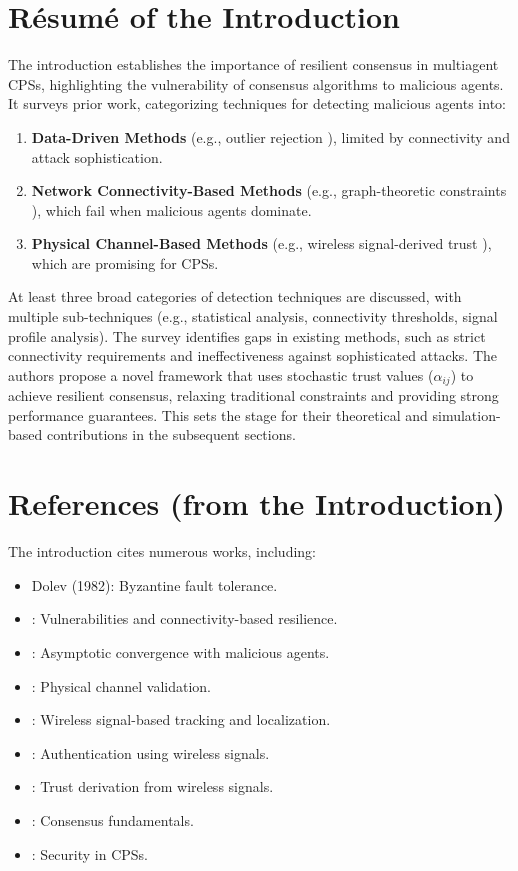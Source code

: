 \documentclass{article}
\begin{document}
\section*{Résumé of the Introduction}
The introduction establishes the importance of resilient consensus in multiagent CPSs, highlighting the vulnerability of consensus algorithms to malicious agents. It surveys prior work, categorizing techniques for detecting malicious agents into:
\begin{enumerate}
    \item \textbf{Data-Driven Methods} (e.g., outlier rejection \cite{ref8}), limited by connectivity and attack sophistication.
    \item \textbf{Network Connectivity-Based Methods} (e.g., graph-theoretic constraints \cite{ref1}), which fail when malicious agents dominate.
    \item \textbf{Physical Channel-Based Methods} (e.g., wireless signal-derived trust \cite{ref20,ref49,ref54}), which are promising for CPSs.
\end{enumerate}

At least three broad categories of detection techniques are discussed, with multiple sub-techniques (e.g., statistical analysis, connectivity thresholds, signal profile analysis). The survey identifies gaps in existing methods, such as strict connectivity requirements and ineffectiveness against sophisticated attacks. The authors propose a novel framework that uses stochastic trust values ($\alpha_{ij}$) to achieve resilient consensus, relaxing traditional constraints and providing strong performance guarantees. This sets the stage for their theoretical and simulation-based contributions in the subsequent sections.

\section*{References (from the Introduction)}
The introduction cites numerous works, including:
\begin{itemize}
    \item \cite{ref1} Dolev (1982): Byzantine fault tolerance.
    \item \cite{ref5,ref6}: Vulnerabilities and connectivity-based resilience.
    \item \cite{ref8}: Asymptotic convergence with malicious agents.
    \item \cite{ref11,ref12,ref13,ref14,ref44,ref45}: Physical channel validation.
    \item \cite{ref15,ref16,ref18,ref48,ref49,ref50}: Wireless signal-based tracking and localization.
    \item \cite{ref19,ref51,ref52}: Authentication using wireless signals.
    \item \cite{ref20,ref49,ref54}: Trust derivation from wireless signals.
    \item \cite{ref25,ref26,ref27,ref28,ref29,ref30,ref31,ref32,ref33,ref34}: Consensus fundamentals.
    \item \cite{ref35,ref36,ref37,ref38,ref39,ref40,ref41,ref42}: Security in CPSs.
\end{itemize}
\end{document}
